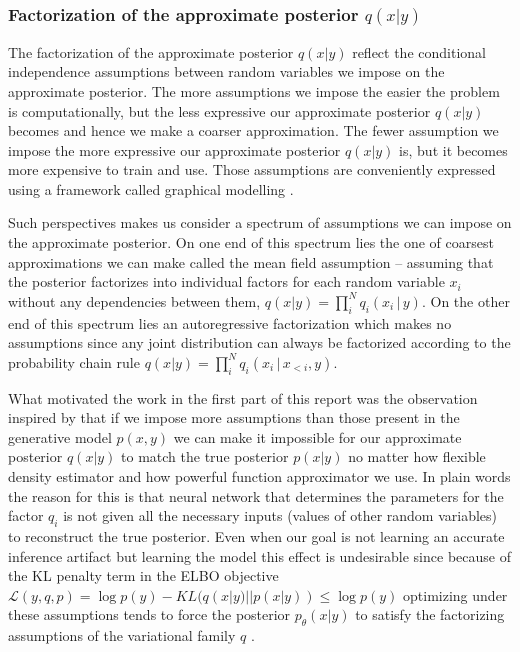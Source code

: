 \documentclass[12pt]{article}
\begin{document}
\subsubsection*{Factorization of the approximate posterior $q(x|y)$}


The factorization of the approximate posterior $q(x|y)$ reflect the conditional independence assumptions between random variables we impose on the approximate posterior.
The more assumptions we impose the easier the problem is computationally, but the less expressive our approximate posterior $q(x|y)$ becomes and hence we make a coarser approximation.
The fewer assumption we impose the more expressive our approximate posterior $q(x|y)$ is, but it becomes more expensive to train and use.
Those assumptions are conveniently expressed using a framework called graphical modelling \citep{KollerFriedman2009}.

Such perspectives makes us consider a spectrum of assumptions we can impose on the approximate posterior.
On one end of this spectrum lies the one of coarsest approximations we can make called the mean field assumption -- assuming that the posterior factorizes into individual factors for each random variable $x_i$ without any dependencies between them, $q(x|y)=\prod^N_iq_i(x_i\,|\,y)$.
On the other end of this spectrum lies an autoregressive factorization which makes no assumptions since any joint distribution can always be factorized according to the probability chain rule $q(x|y)=\prod^N_iq_i(x_i\,|\,x_{<i},y)$.

What motivated the work in the first part of this report \citep{Webb2018} was the observation inspired by \citet{StuhlmullerEtAl2013} that if we impose more assumptions than those present in the generative model $p(x,y)$ we can make it impossible for our approximate posterior $q(x|y)$ to match the true posterior $p(x|y)$ no matter how flexible density estimator and how powerful function approximator we use.
In plain words the reason for this is that neural network that determines the parameters for the factor $q_i$ is not given all the necessary inputs (values of other random variables) to reconstruct the true posterior.
Even when our goal is not learning an accurate inference artifact but learning the model this effect is undesirable
since because of the KL penalty term in the ELBO objective
$\mathcal{L}(y,q,p)=\log p(y)-KL(q(x|y) || p(x|y)) \le \log p(y)$ \citep{VAE}
optimizing under these assumptions tends to force the posterior $p_\theta(x|y)$ to satisfy the factorizing assumptions of the variational family $q$ \citep{FIVO}.
\end{document}
